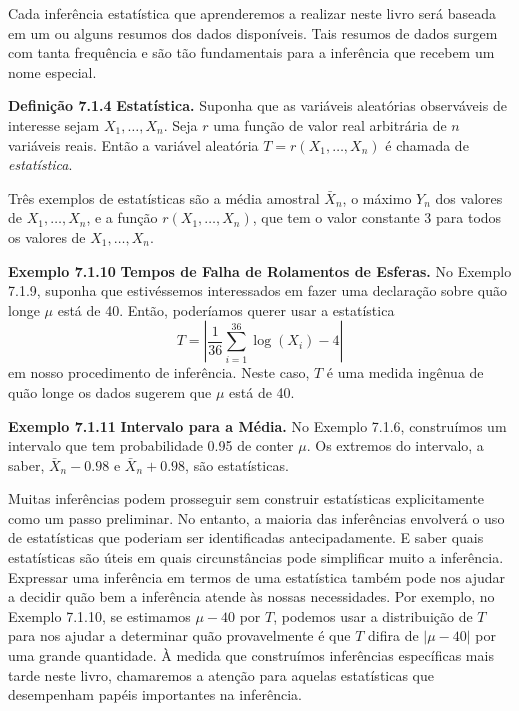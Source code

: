 \vspace{1cm}
Cada inferência estatística que aprenderemos a realizar neste livro será baseada em um ou alguns resumos dos dados disponíveis. Tais resumos de dados surgem com tanta frequência e são tão fundamentais para a inferência que recebem um nome especial.

\vspace{1cm}
\noindent\textbf{Definição 7.1.4} \quad \textbf{Estatística.} Suponha que as variáveis aleatórias observáveis de interesse sejam $X_1, \dots, X_n$. Seja $r$ uma função de valor real arbitrária de $n$ variáveis reais. Então a variável aleatória $T = r(X_1, \dots, X_n)$ é chamada de \textit{estatística}.

\vspace{1cm}
Três exemplos de estatísticas são a média amostral $\bar{X}_n$, o máximo $Y_n$ dos valores de $X_1, \dots, X_n$, e a função $r(X_1, \dots, X_n)$, que tem o valor constante 3 para todos os valores de $X_1, \dots, X_n$.

\vspace{1cm}
\noindent\textbf{Exemplo 7.1.10} \quad \textbf{Tempos de Falha de Rolamentos de Esferas.} No Exemplo 7.1.9, suponha que estivéssemos interessados em fazer uma declaração sobre quão longe $\mu$ está de 40. Então, poderíamos querer usar a estatística
$$ T = \left| \frac{1}{36}\sum_{i=1}^{36}\log(X_i) - 4 \right| $$
em nosso procedimento de inferência. Neste caso, $T$ é uma medida ingênua de quão longe os dados sugerem que $\mu$ está de 40.

\vspace{1cm}
\noindent\textbf{Exemplo 7.1.11} \quad \textbf{Intervalo para a Média.} No Exemplo 7.1.6, construímos um intervalo que tem probabilidade 0.95 de conter $\mu$. Os extremos do intervalo, a saber, $\bar{X}_n - 0.98$ e $\bar{X}_n + 0.98$, são estatísticas.

\vspace{1cm}
Muitas inferências podem prosseguir sem construir estatísticas explicitamente como um passo preliminar. No entanto, a maioria das inferências envolverá o uso de estatísticas que poderiam ser identificadas antecipadamente. E saber quais estatísticas são úteis em quais circunstâncias pode simplificar muito a inferência. Expressar uma inferência em termos de uma estatística também pode nos ajudar a decidir quão bem a inferência atende às nossas necessidades. Por exemplo, no Exemplo 7.1.10, se estimamos $\mu-40$ por $T$, podemos usar a distribuição de $T$ para nos ajudar a determinar quão provavelmente é que $T$ difira de $|\mu-40|$ por uma grande quantidade. À medida que construímos inferências específicas mais tarde neste livro, chamaremos a atenção para aquelas estatísticas que desempenham papéis importantes na inferência.

